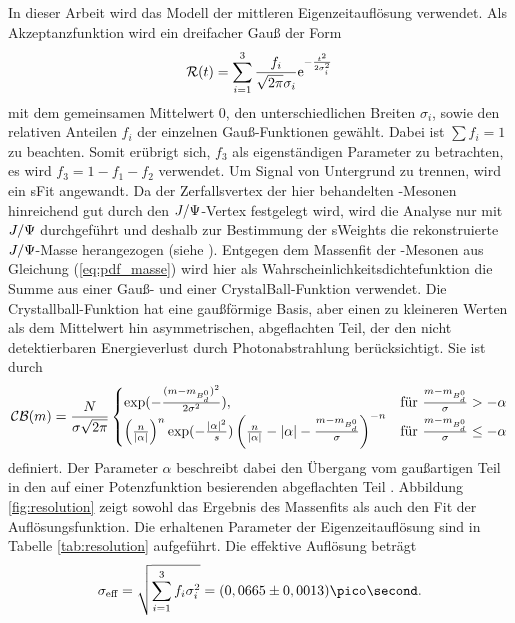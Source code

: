 In dieser Arbeit wird das Modell der mittleren Eigenzeitauflösung verwendet. Als Akzeptanzfunktion wird ein dreifacher Gauß der Form
\begin{align}
\mathcal{R}(t) = \sum_{i=1}^{3} \frac{f_i}{\sqrt{2\pi}\sigma_i}\mathrm{e}^{-\frac{t^2}{2\sigma_i^2}}
\end{align}
mit dem gemeinsamen Mittelwert $0$, den unterschiedlichen Breiten $\sigma_i$, sowie den relativen Anteilen $f_i$ der einzelnen Gauß-Funktionen gewählt. Dabei ist $\sum f_i = 1$ zu beachten. Somit erübrigt sich, $f_3$ als eigenständigen Parameter zu betrachten, es wird $f_3 = 1 - f_1 - f_2$ verwendet. Um Signal von Untergrund zu trennen, wird ein sFit angewandt. Da der Zerfallsvertex der hier behandelten \Bd-Mesonen hinreichend gut durch den $J/\Psi$-Vertex festgelegt wird, wird die Analyse nur mit $J/\Psi$ durchgeführt und deshalb zur Bestimmung der sWeights die rekonstruierte $J/\Psi$-Masse herangezogen (siehe \cite{lhcb-paper}). Entgegen dem Massenfit der \Bd-Mesonen aus Gleichung (\ref{eq:pdf_masse}) wird hier als Wahrscheinlichkeitsdichtefunktion die Summe aus einer Gauß- und einer CrystalBall-Funktion verwendet. Die Crystallball-Funktion hat eine gaußförmige Basis, aber einen zu kleineren Werten als dem Mittelwert hin asymmetrischen, abgeflachten Teil, der den nicht detektierbaren Energieverlust durch Photonabstrahlung berücksichtigt. Sie ist durch
\begin{align}
\mathcal{CB}(m) = \frac{N}{\sigma\sqrt{2\pi}} \begin{cases} \exp(-\frac{(m-m_{\text{$B_d^0$}})^2}{2\sigma^2}), & \text{für }\frac{m-m_{\text{$B_d^0$}}}{\sigma}>-\alpha \\ \left(\frac{n}{|\alpha|}\right)^n \exp(-\frac{|\alpha|^2}{s}) \left(\frac{n}{|\alpha|}-|\alpha|-\frac{m-m_{\text{$B_d^0$}}}{\sigma}\right)^{-n} & \text{für }\frac{m-m_{\text{$B_d^0$}}}{\sigma}\leq -\alpha \end{cases} 
\end{align}
definiert. Der Parameter $\alpha$ beschreibt dabei den Übergang vom gaußartigen Teil in den auf einer Potenzfunktion besierenden abgeflachten Teil \cite{crystal_ball}. Abbildung \ref{fig:resolution} zeigt sowohl das Ergebnis des Massenfits als auch den Fit der Auflösungsfunktion. Die erhaltenen Parameter der Eigenzeitauflösung sind in Tabelle \ref{tab:resolution} aufgeführt. Die effektive Auflösung beträgt
\begin{align}
\sigma_{\text{eff}} = \sqrt{\sum_{i=1}^3 f_i \sigma_i^2} = (0,0665\pm 0,0013)\ps.
\end{align}

